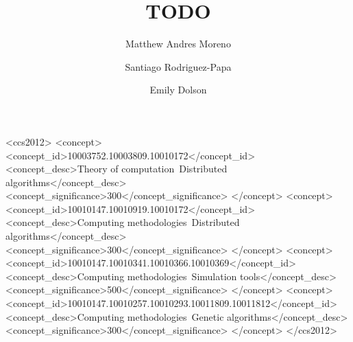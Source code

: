 \documentclass[dvipsnames,format=sigconf,anonymous=true]{acmart}
\begin{document}
\title{TODO}

\author{Matthew Andres Moreno}

\author{Santiago Rodriguez-Papa}

\author{Emily Dolson}

\renewcommand{\shortauthors}{Moreno et al.}





\begin{CCSXML}
<ccs2012>
   <concept>
       <concept_id>10003752.10003809.10010172</concept_id>
       <concept_desc>Theory of computation~Distributed algorithms</concept_desc>
       <concept_significance>300</concept_significance>
       </concept>
   <concept>
       <concept_id>10010147.10010919.10010172</concept_id>
       <concept_desc>Computing methodologies~Distributed algorithms</concept_desc>
       <concept_significance>300</concept_significance>
       </concept>
   <concept>
       <concept_id>10010147.10010341.10010366.10010369</concept_id>
       <concept_desc>Computing methodologies~Simulation tools</concept_desc>
       <concept_significance>500</concept_significance>
       </concept>
   <concept>
       <concept_id>10010147.10010257.10010293.10011809.10011812</concept_id>
       <concept_desc>Computing methodologies~Genetic algorithms</concept_desc>
       <concept_significance>300</concept_significance>
       </concept>
 </ccs2012>
\end{CCSXML}
\end{document}
